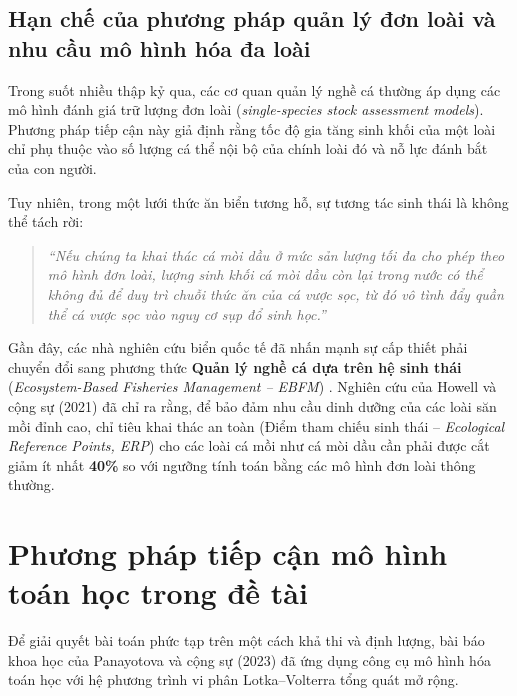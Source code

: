 \subsection{Hạn chế của phương pháp quản lý đơn loài và nhu cầu mô hình hóa đa loài}
Trong suốt nhiều thập kỷ qua, các cơ quan quản lý nghề cá thường áp dụng các mô hình đánh giá trữ lượng đơn loài (\textit{single-species stock assessment models}). Phương pháp tiếp cận này giả định rằng tốc độ gia tăng sinh khối của một loài chỉ phụ thuộc vào số lượng cá thể nội bộ của chính loài đó và nỗ lực đánh bắt của con người. 

Tuy nhiên, trong một lưới thức ăn biển tương hỗ, sự tương tác sinh thái là không thể tách rời:
\begin{quote}
\textit{``Nếu chúng ta khai thác cá mòi dầu ở mức sản lượng tối đa cho phép theo mô hình đơn loài, lượng sinh khối cá mòi dầu còn lại trong nước có thể không đủ để duy trì chuỗi thức ăn của cá vược sọc, từ đó vô tình đẩy quần thể cá vược sọc vào nguy cơ sụp đổ sinh học.''}
\end{quote}
Gần đây, các nhà nghiên cứu biển quốc tế đã nhấn mạnh sự cấp thiết phải chuyển đổi sang phương thức \textbf{Quản lý nghề cá dựa trên hệ sinh thái} (\textit{Ecosystem-Based Fisheries Management -- EBFM}) \cite{anstead2021path, howell2021combining}. Nghiên cứu của Howell và cộng sự (2021) \cite{howell2021combining} đã chỉ ra rằng, để bảo đảm nhu cầu dinh dưỡng của các loài săn mồi đỉnh cao, chỉ tiêu khai thác an toàn (Điểm tham chiếu sinh thái -- \textit{Ecological Reference Points, ERP}) cho các loài cá mồi như cá mòi dầu cần phải được cắt giảm ít nhất \textbf{40\%} so với ngưỡng tính toán bằng các mô hình đơn loài thông thường.

\section{Phương pháp tiếp cận mô hình toán học trong đề tài}
\label{sec:intro_methodology}

Để giải quyết bài toán phức tạp trên một cách khả thi và định lượng, bài báo khoa học của Panayotova và cộng sự (2023) \cite{panayotova2023bioeconomic} đã ứng dụng công cụ mô hình hóa toán học với hệ phương trình vi phân Lotka--Volterra tổng quát mở rộng.

